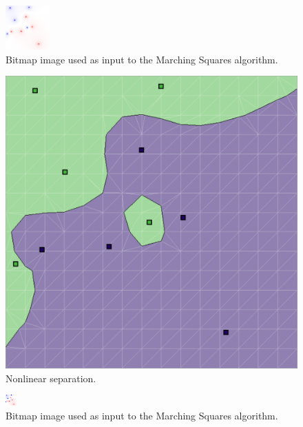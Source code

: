 \documentclass[12pt]{article}
\begin{document}
\begin{figure} 
\centering
  \includegraphics[width = 3 in]{64_res_image.png}
  \caption{Bitmap image used as input to the Marching Squares algorithm.
}
\end{figure}

\begin{figure} 
\centering
  \includegraphics[width = 3 in]{16_res.png}
  \caption{Nonlinear separation.
}
\end{figure}

\begin{figure} 
\centering
  \includegraphics[width = 3 in]{16_res_image.png}
  \caption{Bitmap image used as input to the Marching Squares algorithm.
}
\end{figure}
\end{document}
